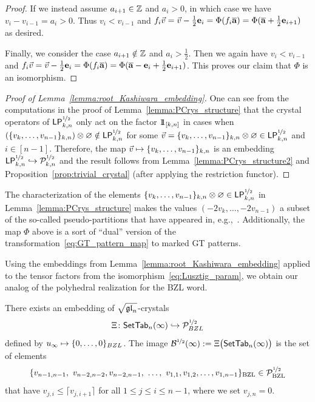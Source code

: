 \documentclass[11pt]{article}
\begin{document}
\begin{proof}
If we instead assume $a_{i+1} \in \ZZ$ and $a_i > 0$, in which case we have $v_i - v_{i-1} = a_i > 0$.
Thus $v_i < v_{i-1}$ and $f_i \vec{v} = \vec{v} - \frac{1}{2} \e_i = \Phi(f_i \overline{\bfa}) = \Phi(\overline{\bfa} + \frac{1}{2}\e_{i+1})$ as desired.

Finally, we consider the case $a_{i+1} \notin \ZZ$ and $a_i > \frac{1}{2}$. Then we again have $v_i < v_{i-1}$ and $f_i \vec{v} = \vec{v} - \frac{1}{2} \e_i = \Phi(f_i \overline{\bfa}) = \Phi(\overline{\bfa} - \e_i + \frac{1}{2}\e_{i+1})$. This proves our claim that $\Phi$ is an isomorphism.
\end{proof}

\begin{proof}[Proof of Lemma~\ref{lemma:root_Kashiwara_embedding}]
One can see from the computations in the proof of Lemma~\ref{lemma:PCrys_structure} that the crystal operators of $\PCrysR{k}$ only act on the factor $\one_{[k,n]}$ in cases when $(\uj{k,n}{v_k, \dotsc, v_{n-1}})\otimes \varnothing \notin \PCrysR{k}$ for some $\vec{v} = \uj{k,n}{v_k, \dotsc, v_{n-1}}\otimes \varnothing \in \PCrysR{k}$ and $i \in [n-1]$.
Therefore, the map $ \vec{v} \mapsto  \uj{k,n}{v_k, \dotsc, v_{n-1}}$ is an embedding $\PCrysR{k} \hookrightarrow \sqrtE_{k,n}$ and the result follows from Lemma~\ref{lemma:PCrys_structure2} and Proposition~\ref{prop:trivial_crystal} (after applying the restriction functor).
\end{proof}



The characterization of the elements $\uj{k,n}{v_k, \dotsc, v_{n-1}}\otimes \varnothing \in \PCrysR{k}$ in Lemma~\ref{lemma:PCrys_structure} makes the values $(-2v_k, \dotsc, -2v_{n-1})$ a subset of the so-called pseudo-partitions that have appeared in, e.g.,~\cite{AGS20}.
Additionally, the map $\Phi$ above is a sort of ``dual'' version of the transformation~\eqref{eq:GT_pattern_map}  to marked GT patterns.



Using the embeddings from Lemma~\ref{lemma:root_Kashiwara_embedding} applied to the tensor factors from the isomorphism~\eqref{eq:Lusztig_param}, we obtain our analog of the polyhedral realization for the BZL word.

\begin{theorem}
\label{bzl-thm}
There exists an embedding of $\sqgln$-crystals
\begin{equation}
\label{eq:Kashiwara_BZL_embedding}
\Xi \colon \SetTab_n(\infty) \hookrightarrow \sqrtE_{BZL}
\end{equation}
defined by $u_{\infty} \mapsto \uj{BZL}{0,\dotsc,0}$.
The image $\sqrtB(\infty) := \Xi\bigl(\SetTab_n(\infty)\bigr)$ 
 is the set of elements
\[
\uj{\BZL}{v_{n-1,n-1},\  v_{n-2,n-2}, v_{n-2,n-1},\ \dotsc,\  v_{1,1},  v_{1,2},  \dotsc,  v_{1,n-1}} \in  \sqrtE_{\BZL}
\]
that have $v_{j,i} \leq \lceil v_{j,i+1} \rceil$ for all $1\leq j \leq i \leq n-1$, where we set $v_{j,n} = 0$.
\end{theorem}
\end{document}
